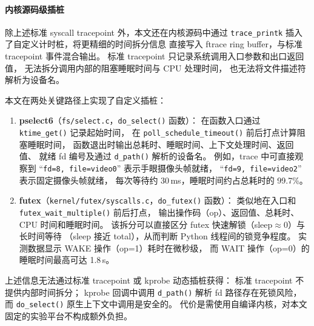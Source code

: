 \paragraph{内核源码级插桩}

除上述标准 syscall tracepoint 外，本文还在内核源码中通过
\texttt{trace\_printk} 插入了自定义计时桩，将更精细的时间拆分信息
直接写入 ftrace ring buffer，与标准 tracepoint 事件混合输出。
标准 tracepoint 只记录系统调用入口参数和出口返回值，
无法拆分调用内部的阻塞睡眠时间与 CPU 处理时间，
也无法将文件描述符解析为设备名。

本文在两处关键路径上实现了自定义插桩：

\begin{enumerate}[leftmargin=2em]
  \item \textbf{pselect6}（\texttt{fs/select.c}，\texttt{do\_select()} 函数）：
    在函数入口通过 \texttt{ktime\_get()} 记录起始时间，
    在 \texttt{poll\_schedule\_timeout()} 前后打点计算阻塞睡眠时间，
    函数退出时输出总耗时、睡眠时间、上下文处理时间、返回值、
    就绪 fd 编号及通过 \texttt{d\_path()} 解析的设备名。
    例如，trace 中可直接观察到
    ``\texttt{fd=8, file=video0}'' 表示手眼摄像头帧就绪，
    ``\texttt{fd=9, file=video2}'' 表示固定摄像头帧就绪，
    每次等待约 30\,ms，睡眠时间约占总耗时的 99.7\%。
  \item \textbf{futex}（\texttt{kernel/futex/syscalls.c}，\texttt{do\_futex()} 函数）：
    类似地在入口和 \texttt{futex\_wait\_multiple()} 前后打点，
    输出操作码（op）、返回值、总耗时、CPU 时间和睡眠时间。
    该拆分可以直接区分 futex 快速解锁（sleep$\approx$0）与长时间等待
    （sleep 接近 total），从而判断 Python 线程间的锁竞争程度。
    实测数据显示 WAKE 操作（op=1）耗时在微秒级，
    而 WAIT 操作（op=0）的睡眠时间最高可达 1.8\,s。
\end{enumerate}

上述信息无法通过标准 tracepoint 或 kprobe 动态插桩获得：
标准 tracepoint 不提供内部时间拆分；
kprobe 回调中调用 \texttt{d\_path()} 解析 fd 路径存在死锁风险，
而 \texttt{do\_select()} 原生上下文中调用是安全的。
代价是需使用自编译内核，对本文固定的实验平台不构成额外负担。


